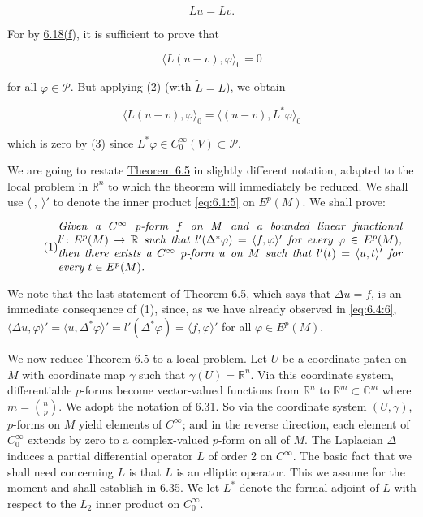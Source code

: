 \begin{remarks}
\begin{equation}
\tag{4}\label{eq:6.31:4}
L u=L v.
\end{equation}

For by \hyperref[thm:6.18]{6.18(f)}, it is sufficient to prove that

\begin{equation}
\tag{5}\label{eq:6.31:5}
\langle L(u-v),\varphi\rangle_{0}=0
\end{equation}

for all $\varphi \in \mathcal{P}$. But applying (2) (with $\tilde{L} = L$), we obtain

\[
\langle L(u-v),\varphi\rangle_{0}=\langle(u-v),L^{*}\varphi\rangle_{0}
\]

which is zero by (3) since $L^{*}\varphi\in C_{0}^{\infty}(V)\subset\mathcal{P}$.

\end{remarks}

\label{thm:6.32} We are going to restate \hyperref[thm:6.5]{Theorem 6.5} in slightly different notation, adapted to the local problem in  $ \mathbb{R}^{n} $ to which the theorem will immediately be reduced. We shall use $\langle\ ,\ \rangle'$ to denote the inner product \eqref{eq:6.1:5} on  $ E^{p}(M) $. We shall prove:

\begin{equation}
\tag{1}\label{eq:6.32:1}
\parbox{.88\linewidth}{\itshape Given a $C^\infty$ p-form $f$ on $M$ and a bounded linear functional $l'\colon E^p(M) \to \mathbb{R}$ such that $l'(\Delta^*\varphi) = \langle f,\varphi\rangle'$ for every $\varphi \in E^p(M)$, then there exists a $C^\infty$ p-form $u$ on $M$ such that $l'(t) = \langle u,t\rangle'$ for every $t \in E^p(M)$.}
\end{equation}

We note that the last statement of \hyperref[thm:6.5]{Theorem 6.5}, which says that $\Delta u = f$, is an immediate consequence of (1), since, as we have already observed in \eqref{eq:6.4:6}, $\langle\Delta u,\varphi\rangle' = \langle u,\Delta^*\varphi\rangle' = l'(\Delta^*\varphi) = \langle f,\varphi\rangle'$ for all $\varphi \in E^p(M)$.

We now reduce \hyperref[thm:6.5]{Theorem 6.5} to a local problem. Let $U$ be a coordinate patch on $M$ with coordinate map $\gamma$ such that $\gamma(U) = \mathbb{R}^n$. Via this coordinate system, differentiable $p$-forms become vector-valued functions from $\mathbb{R}^n$ to $\mathbb{R}^m \subset \mathbb{C}^m$ where $m = \binom{n}{p}$. We adopt the notation of 6.31. So via the coordinate system $(U,\gamma)$, $p$-forms on $M$ yield elements of $C^\infty$; and in the reverse direction, each element of $C_0^\infty$ extends by zero to a complex-valued $p$-form on all of $M$. The Laplacian $\Delta$ induces a partial differential operator $L$ of order 2 on $C^\infty$. The basic fact that we shall need concerning $L$ is that $L$ is an elliptic operator. This we assume for the moment and shall establish in 6.35. We let $L^*$ denote the formal adjoint of $L$ with respect to the $L_2$ inner product on $C_0^\infty$.

